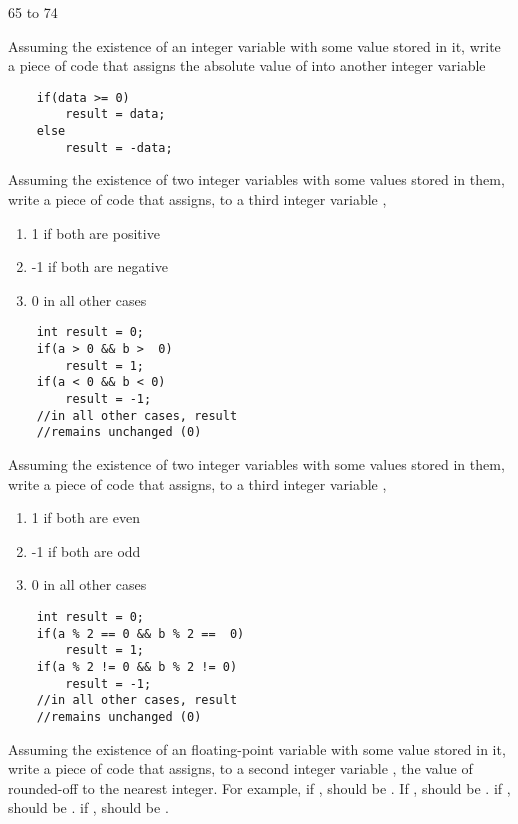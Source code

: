 \begin{questions}
\begin{solution}
65 to 74
\end{solution}  \question
Assuming the existence of an integer variable  with some value stored in it, write a piece of code that assigns the absolute value of  into another integer variable  

\begin{solution}
\begin{lstlisting}
	if(data >= 0)
		result = data;
	else
		result = -data;
\end{lstlisting}
\end{solution}  \question
Assuming the existence of two integer variables  with some values stored in them, write a piece of code that assigns, to a third integer variable ,

	\begin{enumerate}
	\item 1 if both 	 are positive
	\item -1 if both  are negative
	\item 0 in all other cases
	\end{enumerate}

\begin{solution}
\begin{lstlisting}
	int result = 0;
	if(a > 0 && b >  0)
		result = 1;
 	if(a < 0 && b < 0)
 		result = -1;
 	//in all other cases, result
 	//remains unchanged (0)
\end{lstlisting}
\end{solution}  \question
Assuming the existence of two integer variables  with some values stored in them, write a piece of code that assigns, to a third integer variable ,

	\begin{enumerate}
	\item 1 if both 	 are even
	\item -1 if both  are odd
	\item 0 in all other cases
	\end{enumerate}
	
\begin{solution}
\begin{lstlisting}
	int result = 0;
	if(a % 2 == 0 && b % 2 ==  0)
		result = 1;
 	if(a % 2 != 0 && b % 2 != 0)
 		result = -1;
 	//in all other cases, result
 	//remains unchanged (0)
\end{lstlisting}
\end{solution}  \question
Assuming the existence of an floating-point variable  with some value stored in it, write a piece of code that assigns, to a second integer variable , the value of  rounded-off to the nearest integer. For example, if ,  should be . If ,  should be .  if ,  should be .  if ,  should be .


\end{questions}
